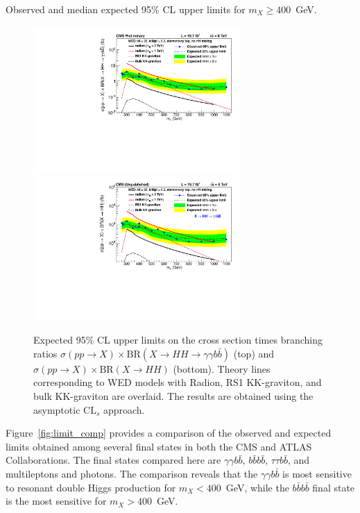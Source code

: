 \begin{table}[ht!]
  \centering
  \renewcommand{\arraystretch}{1.4}
  \caption{Observed and median expected 95\% CL upper limits for $m_X \ge 400$~GeV.}
  
  \label{table:limits_highmass}
\end{table}

\begin{figure}[ht!]
 \begin{center}
   \includegraphics[width=0.7\textwidth]{figures/results/WP4_cutbased_all.pdf}
   \includegraphics[width=0.7\textwidth]{figures/results/WP4_cutbased_HH.pdf}
 \end{center}
\caption{Expected 95\% CL upper limits on the cross section times branching ratios
$\sigma(pp\rightarrow X) \times \text{BR}( X \rightarrow HH \rightarrow \gamma\gamma b\bar{b})$ (top)
and $\sigma(pp\rightarrow X) \times \text{BR}( X \rightarrow HH )$ (bottom).
Theory lines corresponding to WED models with Radion, RS1 KK-graviton, and bulk KK-graviton are
overlaid. The results are obtained using the asymptotic $\text{CL}_s$ approach.}
\label{fig:limits_allres}
\end{figure}

Figure~\ref{fig:limit_comp} provides a comparison of the observed and expected limits obtained
among several final states in both the CMS and ATLAS Collaborations. The final states compared here
are $\gamma \gamma b\bar{b}$, $b\bar{b}b\bar{b}$, $\tau\tau b\bar{b}$, and multileptons and photons.
The comparison reveals that the $\gamma \gamma b\bar{b}$ is most sensitive to resonant double
Higgs production for $m_X < 400$~GeV, while the $b\bar{b}b\bar{b}$ final state is the most sensitive
for $m_X > 400$~GeV.

